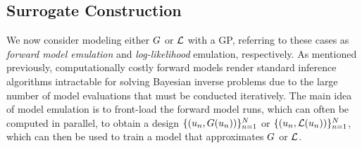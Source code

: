 \documentclass[12pt]{article}
\begin{document}
\subsection{Surrogate Construction}
We now consider modeling either $G$ or $\mathcal{L}$ with a GP, referring to these cases as \textit{forward model emulation} and 
\textit{log-likelihood} emulation, respectively. As mentioned previously, computationally costly forward models render 
standard inference algorithms intractable for solving Bayesian inverse problems due to the large number of model 
evaluations that must be conducted iteratively. The main idea of model emulation is to front-load the forward model 
runs, which can often be computed in parallel, to obtain a design 
$\{(u_{n}, G(u_{n}))\}_{n=1}^{N}$ or 
$\{(u_{n}, \mathcal{L}(u_{n}))\}_{n=1}^{N}$, which can then be used to train a model that 
approximates $G$ or $\mathcal{L}$. 
\end{document}
